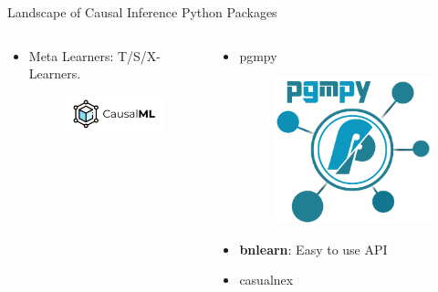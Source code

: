 \documentclass{beamer}
\begin{document}
\begin{frame}{Landscape of Causal Inference Python Packages}
\begin{columns}
\begin{column}{0.5 \textwidth}
\begin{itemize}
				\item Meta Learners: T/S/X-Learners.
					\begin{figure}
						\includegraphics[scale=0.3]{imgs/causalml.png}
					\end{figure}
			\end{itemize}

		\end{column}
		\vrule
		\begin{column}{0.5 \textwidth}
			\begin{itemize}
				\item pgmpy
					\begin{figure}
						\includegraphics[scale=0.2]{imgs/pgmpy.png}
					\end{figure}
				\item \textbf{bnlearn}: Easy to use API
				\item casualnex
					\begin{figure}

\end{figure}
\end{itemize}
\end{column}
\end{columns}
\end{frame}
\end{document}
